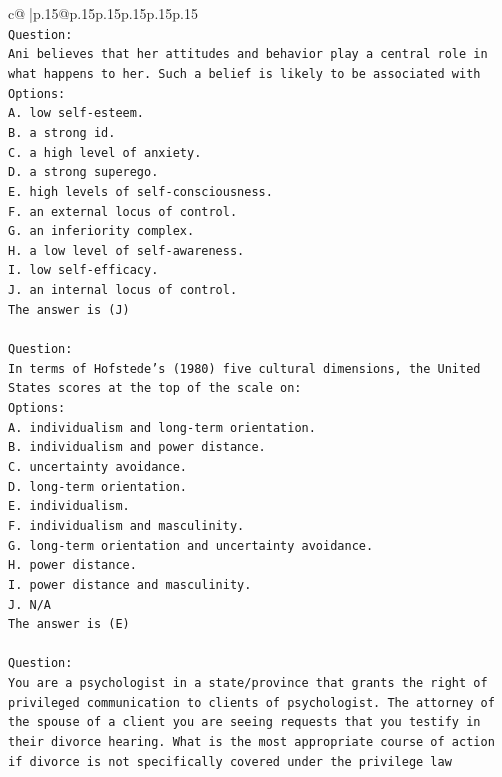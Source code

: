 \documentclass{article}
\begin{document}
{\begin{supertabular}{c@{$\;$}|p{.15\linewidth}@{}p{.15\linewidth}p{.15\linewidth}p{.15\linewidth}p{.15\linewidth}p{.15\linewidth}}
{{{\\ 
\texttt{Question:} \\
\texttt{Ani believes that her attitudes and behavior play a central role in what happens to her. Such a belief is likely to be associated with} \\
\texttt{Options:} \\
\texttt{A. low self{-}esteem.} \\
\texttt{B. a strong id.} \\
\texttt{C. a high level of anxiety.} \\
\texttt{D. a strong superego.} \\
\texttt{E. high levels of self{-}consciousness.} \\
\texttt{F. an external locus of control.} \\
\texttt{G. an inferiority complex.} \\
\texttt{H. a low level of self{-}awareness.} \\
\texttt{I. low self{-}efficacy.} \\
\texttt{J. an internal locus of control.} \\
\texttt{The answer is (J)} \\
\\ 
\texttt{Question:} \\
\texttt{In terms of Hofstede’s (1980) five cultural dimensions, the United States scores at the top of the scale on:} \\
\texttt{Options:} \\
\texttt{A. individualism and long{-}term orientation.} \\
\texttt{B. individualism and power distance.} \\
\texttt{C. uncertainty avoidance.} \\
\texttt{D. long{-}term orientation.} \\
\texttt{E. individualism.} \\
\texttt{F. individualism and masculinity.} \\
\texttt{G. long{-}term orientation and uncertainty avoidance.} \\
\texttt{H. power distance.} \\
\texttt{I. power distance and masculinity.} \\
\texttt{J. N/A} \\
\texttt{The answer is (E)} \\
\\ 
\texttt{Question:} \\
\texttt{You are a psychologist in a state/province that grants the right of privileged communication to clients of psychologist. The attorney of the spouse of a client you are seeing requests that you testify in their divorce hearing. What is the most appropriate course of action if divorce is not specifically covered under the privilege law} \\
}}}
\end{supertabular}}
\end{document}
